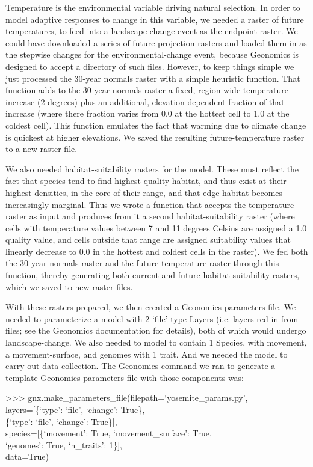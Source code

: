 ﻿\documentclass{article}
\newenvironment{allintypewriter}{\ttfamily}{\par}
\begin{document}
Temperature is the environmental variable driving natural selection. 
In order to model adaptive responses to change in this variable,
we needed a raster of future temperatures,
to feed into a landscape-change event as the endpoint raster.
We could have downloaded a series of future-projection rasters and loaded
them in as the stepwise changes for the environmental-change event,
because Geonomics is designed to accept a directory of such files.
However, to keep things simple we just processed the 30-year normals raster
with a simple heuristic function.
That function adds to the 30-year normals raster a fixed, region-wide
temperature increase (2 degrees) plus an additional, elevation-dependent fraction
of that increase (where there fraction varies from
0.0 at the hottest cell to 1.0 at the coldest cell).
This function emulates the fact that warming due to climate change is quickest at higher elevations.
We saved the resulting future-temperature raster to a new raster file.

We also needed habitat-suitability rasters for the model.
These must reflect the fact that species tend to find highest-quality habitat,
and thus exist at their highest densities, in the core of their range,
and that edge habitat becomes increasingly marginal. 
Thus we wrote a function that accepts the temperature raster as input and produces from
it a second habitat-suitability raster (where cells with temperature values
between 7 and 11 degrees Celsius are assigned a 1.0 quality value,
and cells outside that range are assigned suitability values that linearly decrease
to 0.0 in the hottest and coldest cells in the raster).
We fed both the 30-year normals raster and the future temperature raster through this function,
thereby generating both current and future habitat-suitability rasters,
which we saved to new raster files.

With these rasters prepared, we then created a Geonomics parameters file.
We needed to parameterize a model with 2 `file'-type Layers
(i.e. layers red in from files; see the Geonomics documentation for details),
both of which would undergo landscape-change.
We also needed to model to contain 1 Species,
with movement, a movement-surface, and genomes with 1 trait.
And we needed the model to carry out data-collection.
The Geonomics command we ran to generate a template Geonomics parameters
file with those components was:

\begin{allintypewriter}
>>> gnx.make\_parameters\_file(filepath=`yosemite\_params.py',\\
                               layers=[\{`type': `file', `change': True\},\\
                                       \{`type': `file', `change': True\}],\\
                               species=[\{`movement': True, `movement\_surface': True,\\
                                          `genomes': True, `n\_traits': 1\}],\\
                               data=True)\\
\end{allintypewriter}
\end{document}
